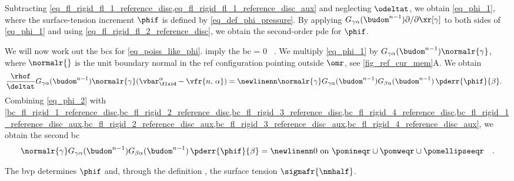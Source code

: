 \begin{enumerate}
{                Subtracting \cref{eq_fl_rigid_fl_1_reference_disc,eq_fl_rigid_fl_1_reference_disc_aux} and neglecting $\odeltat$, we obtain \cref{eq_phi_1},        where the surface-tension increment $\phif$ is defined by \cref{eq_def_phi_pressure}.
                By applying $G_{\gamma \alpha}(\budom^{n-1}) \partial / \partial \xr[\gamma]$ to both sides of \cref{eq_phi_1} and using \cref{eq_fl_rigid_fl_2_reference_disc}, we obtain the second-order \ac{pde}  for $\phif$.



                We will now work out the \acp{bc} for \cref{eq_poiss_like_phi}.  imply the \ac{bc}
                \be
                \label{bc_phi_1}
                \phif = 0 \,  \pomouteqr.
                \ee
                We multiply \cref{eq_phi_1} by $G_{\gamma \alpha}(\budom^{n-1}) \normalr{\gamma}$, where $\normalr{}$ is the unit boundary normal in the \ac{ref} configuration pointing outside $\omr$, see \cref{fig_ref_cur_mem}A.  We obtain
                \begin{align}
                        \label{eq_phi_2}
                        \frac{\rhof}{\deltat} G_{\gamma \alpha}(\budom^{n-1}) \normalr{\gamma} (\vbarf^\alpha - \vfr{n, \, \alpha}) & = \newlinenn
                        \normalr{\gamma} G_{\gamma \alpha}(\budom^{n-1})  G_{\beta \alpha}(\budom^{n-1})  \,          \pderr{ \phif   }{\beta }.
                \end{align}
                Combining \cref{eq_phi_2} with \cref{bc_fl_rigid_1_reference_disc,bc_fl_rigid_2_reference_disc,bc_fl_rigid_3_reference_disc,bc_fl_rigid_4_reference_disc,bc_fl_rigid_1_reference_disc_aux,bc_fl_rigid_2_reference_disc_aux,bc_fl_rigid_3_reference_disc_aux,bc_fl_rigid_4_reference_disc_aux}, we obtain the second \ac{bc}
                \begin{align}
                        \label{bc_phi_2}
                        \normalr{\gamma}  G_{\gamma \alpha}(\budom^{n-1})  G_{\beta \alpha}(\budom^{n-1}) \,          \pderr{ \phif   }{\beta } & = \newlinenn 0
                        \text{ on } \pomineqr \cup \pomweqr \cup \pomellipseeqr                                                                 & .
                \end{align}

                The \ac{bvp}  determines $\phif$ and, through the definition , the surface tension $\sigmafr{\nmhalf}$.
        }
\end{enumerate}


